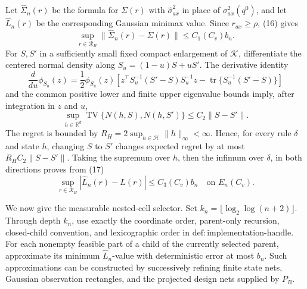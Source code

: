 Let \(\widehat\Sigma_n(r)\) be the formula for \(\Sigma(r)\) with \(\widehat\sigma^2_{ax}\) in place of \(\sigma^2_{ax}(q^0)\), and let \(\widehat L_n(r)\) be the corresponding Gaussian minimax value. Since \(r_{ax}\ge\rho\), (16) gives
\[
\sup_{r\in\mathcal R_B}\lVert\widehat\Sigma_n(r)-\Sigma(r)\rVert
\le C_1(C_v)b_n.
\tag{17}
\]
For \(S,S'\) in a sufficiently small fixed compact enlargement of \(\mathcal K\), differentiate the centered normal density along \(S_u=(1-u)S+uS'\). The derivative identity
\[
\frac{d}{du}\phi_{S_u}(z)
=\frac12\phi_{S_u}(z)
\left[z^\top S_u^{-1}(S'-S)S_u^{-1}z
-\operatorname{tr}\{S_u^{-1}(S'-S)\}\right]
\]
and the common positive lower and finite upper eigenvalue bounds imply, after integration in \(z\) and \(u\),
\[
\sup_{h\in\mathbb R^d}
\operatorname{TV}\{N(h,S),N(h,S')\}
\le C_2\lVert S-S'\rVert.
\]
The regret is bounded by \(R_H=2\sup_{h\in\mathcal H}\lVert h\rVert_\infty<\infty\). Hence, for every rule \(\delta\) and state \(h\), changing \(S\) to \(S'\) changes expected regret by at most \(R_HC_2\lVert S-S'\rVert\). Taking the supremum over \(h\), then the infimum over \(\delta\), in both directions proves from (17)
\[
\sup_{r\in\mathcal R_B}|\widehat L_n(r)-L(r)|
\le C_3(C_v)b_n
\quad\text{on }E_n(C_v).
\tag{18}
\]

We now give the measurable nested-cell selector. Set \(k_n=\lfloor\log_2\log(n+2)\rfloor\). Through depth \(k_n\), use exactly the coordinate order, parent-only recursion, closed-child convention, and lexicographic order in \(\mathrm{def:implementation\text{-}handle}\). For each nonempty feasible part of a child of the currently selected parent, approximate its minimum \(\widehat L_n\)-value with deterministic error at most \(b_n\). Such approximations can be constructed by successively refining finite state nets, Gaussian observation rectangles, and the projected design nets supplied by \(P_B\).

